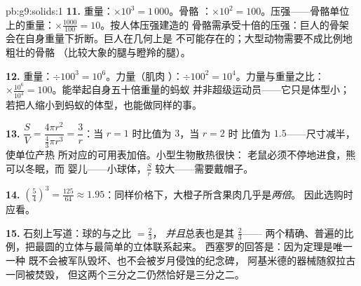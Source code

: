 \begin{solution}{pb:g9:solids:1}
\textbf{11.} 重量：$\times 10^3 = 1\,000$。骨骼
：$\times 10^2 = 100$。压强——骨骼单位
上的重量：$\times \frac{1000}{100} = 10$。按人体压强建造的
骨骼需承受十倍的压强：巨人的骨架
会在自身重量下折断。巨人在几何上是
不可能存在的；大型动物需要不成比例地粗壮的骨骼
（比较大象的腿与瞪羚的腿）。

\textbf{12.} 重量：$\div 100^3 = 10^6$。力量（肌肉
）：$\div 100^2 = 10^4$。力量与重量之比：
$\times \frac{10^6}{10^4} = 100$。能举起自身五十倍重量的蚂蚁
并非超级运动员——它只是体型小；
若把人缩小到蚂蚁的体型，也能做同样的事。

\textbf{13.} $\dfrac{S}{V} = \dfrac{4\pi r^2}{\frac43\pi r^3}
= \dfrac{3}{r}$：当 $r = 1$ 时比值为 $3$，当 $r = 2$ 时
比值为 $1.5$——尺寸减半，使单位产热
所对应的可用表加倍。小型生物散热很快：
老鼠必须不停地进食，熊可以冬眠，而
婴儿——小球体，$\frac Sr$ 较大——需要戴帽子。

\textbf{14.} $\left(\frac54\right)^3 = \frac{125}{64} \approx
1.95$：同样价格下，大橙子所含果肉几乎是\emph{两倍}。
因此选购时应看。

\textbf{15.} 石刻上写道：球的与之比 $= \frac23$，
\emph{并且}总表也是其 $\frac23$——
两个精确、普遍的比例，把最圆的立体与最简单的立体联系起来。
西塞罗的回答是：因为定理是唯一一种
既不会被军队毁坏、也不会被岁月侵蚀的纪念碑，
阿基米德的器械随叙拉古一同被焚毁，
但这两个三分之二仍然恰好是三分之二。
\end{solution}
